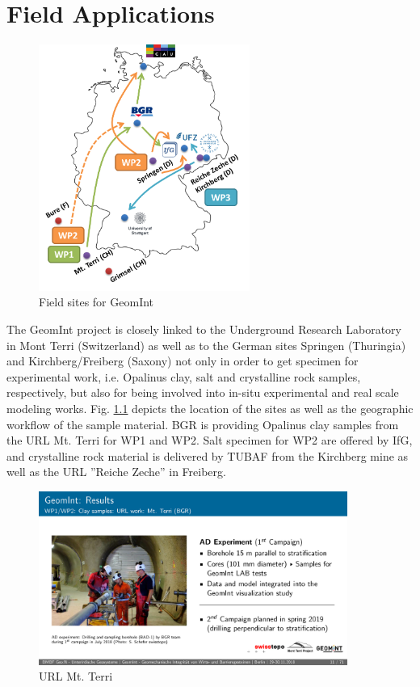 \chapter{Field Applications}


\begin{figure}
\includegraphics[width=6.9cm]{figures/geomint-exp.png}
\caption{Field sites for GeomInt}
\label{fig:geomint-sites}
\end{figure}
The GeomInt project is closely linked to the Underground Research Laboratory in Mont Terri (Switzerland) as well as to the German sites Springen (Thuringia) and Kirchberg/Freiberg (Saxony) not only in order to get specimen for experimental work, i.e. Opalinus clay, salt and crystalline rock samples, respectively, but also for being involved into in-situ experimental and real scale modeling works.
Fig. \ref{fig:geomint-sites} depicts the location of the sites as well as the geographic workflow of the sample material. BGR is providing Opalinus clay samples from the URL Mt. Terri for WP1 and WP2. Salt specimen for WP2 are offered by IfG, and crystalline rock material is delivered by TUBAF from the Kirchberg mine as well as the URL ''Reiche Zeche'' in Freiberg.

\begin{figure}
\includegraphics[width=0.9\textwidth]{figures/geomint-mt-terri.png}
\caption{URL Mt. Terri}
\label{fig:geomint-exp}
\end{figure}

